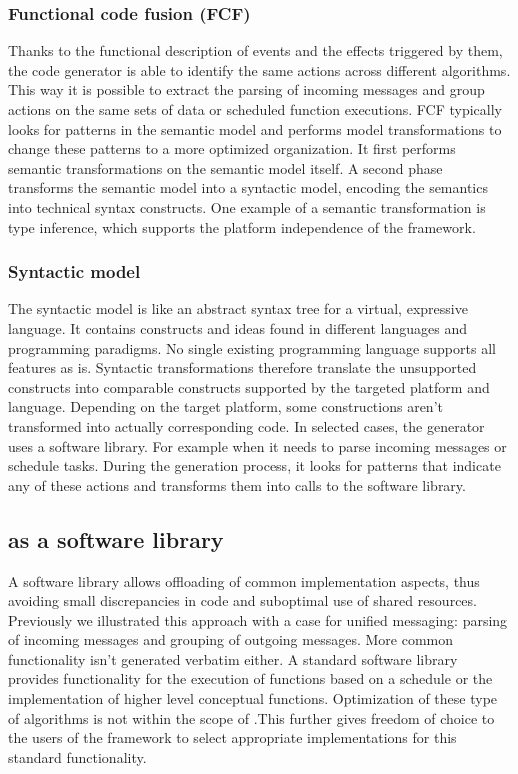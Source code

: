 \documentclass[3p,times,procedia]{elsarticle}
\begin{document}
\subsubsection{Functional code fusion (FCF)}

Thanks to the functional description of events and the effects triggered by
them, the code generator is able to identify the same actions across different
algorithms. This way it is possible to extract the parsing of incoming messages
and group actions on the same sets of data or scheduled function executions.
FCF typically looks for patterns in the semantic model and performs model
transformations to change these patterns to a more optimized organization. It
first performs semantic transformations on the semantic model itself. A second
phase transforms the semantic model into a syntactic model, encoding the
semantics into technical syntax constructs. One example of a semantic
transformation is type inference, which supports the platform independence of
the framework.

\subsubsection{Syntactic model}

The syntactic model is like an abstract syntax tree for a virtual, expressive
language. It contains constructs and ideas found in different languages and
programming paradigms. No single existing programming language supports all
features as is. Syntactic transformations therefore translate the unsupported
constructs into comparable constructs supported by the targeted platform and
language. Depending on the target platform, some constructions aren't
transformed into actually corresponding code. In selected cases, the generator
uses a software library. For example when it needs to parse incoming messages
or schedule tasks. During the generation process, it looks for patterns that
indicate any of these actions and transforms them into calls to the \FOO
software library.

\subsection{\FOO as a software library}
\label{software-lib-design}

A software library allows offloading of common implementation aspects, thus
avoiding small discrepancies in code and suboptimal use of shared resources.
Previously we illustrated this approach with a case for unified messaging:
parsing of incoming messages and grouping of outgoing messages. More common
functionality isn't generated verbatim either. A standard software library
provides functionality for the execution of functions based on a schedule or
the implementation of higher level conceptual functions. Optimization of these
type of algorithms is not within the scope of \FOO.\@ This further gives
freedom of choice to the users of the framework to select appropriate
implementations for this standard functionality.
\end{document}
